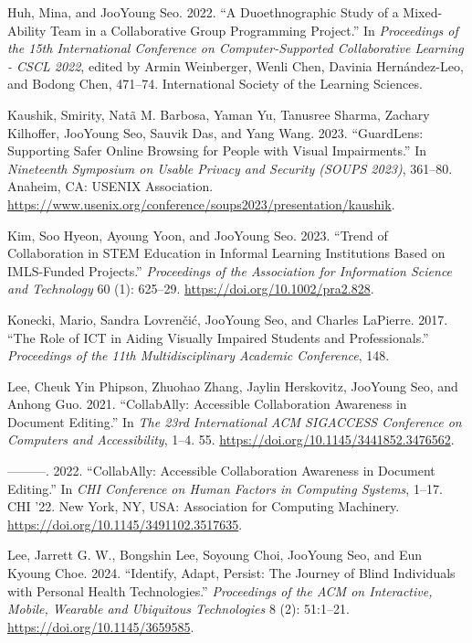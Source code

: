 \documentclass[11pt,a4paper,]{awesome-cv}
\newlength{\cslhangindent}
\newenvironment{CSLReferences}[2] %
 {\begin{list}{}{%
  \setlength{\itemindent}{0pt}
  \setlength{\leftmargin}{0pt}
  \setlength{\parsep}{0pt}
  \ifodd #1
   \setlength{\leftmargin}{\cslhangindent}
   \setlength{\itemindent}{-1\cslhangindent}
  \fi
  \setlength{\itemsep}{#2\baselineskip}}}
 {\end{list}}
\begin{document}
\label{refs-0a0d0fd29f56a34069c75b517e1d0099}
\begin{CSLReferences}{1}{0}
Huh, Mina, and JooYoung Seo. 2022. {``A Duoethnographic Study of a
Mixed-Ability Team in a Collaborative Group Programming Project.''} In
\emph{Proceedings of the 15th International Conference on
Computer-Supported Collaborative Learning - CSCL 2022}, edited by Armin
Weinberger, Wenli Chen, Davinia Hernández-Leo, and Bodong Chen, 471--74.
International Society of the Learning Sciences.

Kaushik, Smirity, Natã M. Barbosa, Yaman Yu, Tanusree Sharma, Zachary
Kilhoffer, JooYoung Seo, Sauvik Das, and Yang Wang. 2023. {``GuardLens:
Supporting Safer Online Browsing for People with Visual Impairments.''}
In \emph{Nineteenth Symposium on Usable Privacy and Security (SOUPS
2023)}, 361--80. Anaheim, CA: USENIX Association.
\url{https://www.usenix.org/conference/soups2023/presentation/kaushik}.

Kim, Soo Hyeon, Ayoung Yoon, and JooYoung Seo. 2023. {``Trend of
Collaboration in STEM Education in Informal Learning Institutions Based
on IMLS-Funded Projects.''} \emph{Proceedings of the Association for
Information Science and Technology} 60 (1): 625--29.
\url{https://doi.org/10.1002/pra2.828}.

Konecki, Mario, Sandra Lovrenčić, JooYoung Seo, and Charles LaPierre.
2017. {``The Role of ICT in Aiding Visually Impaired Students and
Professionals.''} \emph{Proceedings of the 11th Multidisciplinary
Academic Conference}, 148.

Lee, Cheuk Yin Phipson, Zhuohao Zhang, Jaylin Herskovitz, JooYoung Seo,
and Anhong Guo. 2021. {``CollabAlly: Accessible Collaboration Awareness
in Document Editing.''} In \emph{The 23rd International ACM SIGACCESS
Conference on Computers and Accessibility}, 1--4. 55.
\url{https://doi.org/10.1145/3441852.3476562}.

---------. 2022. {``CollabAlly: Accessible Collaboration Awareness in
Document Editing.''} In \emph{CHI Conference on Human Factors in
Computing Systems}, 1--17. CHI '22. New York, NY, USA: Association for
Computing Machinery. \url{https://doi.org/10.1145/3491102.3517635}.

Lee, Jarrett G. W., Bongshin Lee, Soyoung Choi, JooYoung Seo, and Eun
Kyoung Choe. 2024. {``Identify, Adapt, Persist: The Journey of Blind
Individuals with Personal Health Technologies.''} \emph{Proceedings of
the ACM on Interactive, Mobile, Wearable and Ubiquitous Technologies} 8
(2): 51:1--21. \url{https://doi.org/10.1145/3659585}.


\end{CSLReferences}
\end{document}
